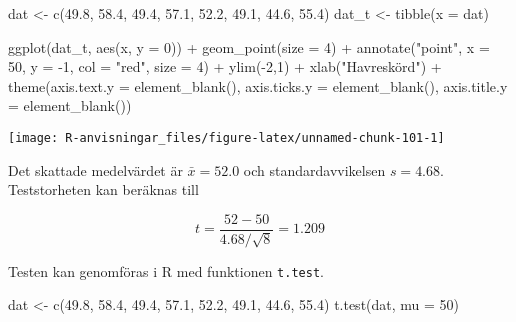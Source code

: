 \documentclass[
]{book}
\newenvironment{Shaded}{\begin{snugshade}}{\end{snugshade}}
\newcommand{\AttributeTok}[1]{\textcolor[rgb]{0.77,0.63,0.00}{#1}}
\newcommand{\DecValTok}[1]{\textcolor[rgb]{0.00,0.00,0.81}{#1}}
\newcommand{\FloatTok}[1]{\textcolor[rgb]{0.00,0.00,0.81}{#1}}
\newcommand{\FunctionTok}[1]{\textcolor[rgb]{0.00,0.00,0.00}{#1}}
\newcommand{\NormalTok}[1]{#1}
\newcommand{\OtherTok}[1]{\textcolor[rgb]{0.56,0.35,0.01}{#1}}
\newcommand{\SpecialCharTok}[1]{\textcolor[rgb]{0.00,0.00,0.00}{#1}}
\newcommand{\StringTok}[1]{\textcolor[rgb]{0.31,0.60,0.02}{#1}}
\theoremstyle{definition}
\theoremstyle{definition}
\theoremstyle{definition}
\theoremstyle{definition}
\theoremstyle{remark}
\begin{document}
\begin{Shaded}
\begin{Highlighting}[]
\NormalTok{dat }\OtherTok{\textless{}{-}} \FunctionTok{c}\NormalTok{(}\FloatTok{49.8}\NormalTok{, }\FloatTok{58.4}\NormalTok{, }\FloatTok{49.4}\NormalTok{, }\FloatTok{57.1}\NormalTok{, }\FloatTok{52.2}\NormalTok{, }\FloatTok{49.1}\NormalTok{, }\FloatTok{44.6}\NormalTok{, }\FloatTok{55.4}\NormalTok{)}
\NormalTok{dat\_t }\OtherTok{\textless{}{-}} \FunctionTok{tibble}\NormalTok{(}\AttributeTok{x =}\NormalTok{ dat)}

\FunctionTok{ggplot}\NormalTok{(dat\_t, }\FunctionTok{aes}\NormalTok{(x, }\AttributeTok{y =} \DecValTok{0}\NormalTok{)) }\SpecialCharTok{+}
  \FunctionTok{geom\_point}\NormalTok{(}\AttributeTok{size =} \DecValTok{4}\NormalTok{) }\SpecialCharTok{+}
  \FunctionTok{annotate}\NormalTok{(}\StringTok{"point"}\NormalTok{, }\AttributeTok{x =} \DecValTok{50}\NormalTok{, }\AttributeTok{y =} \SpecialCharTok{{-}}\DecValTok{1}\NormalTok{, }\AttributeTok{col =} \StringTok{"red"}\NormalTok{, }\AttributeTok{size =} \DecValTok{4}\NormalTok{) }\SpecialCharTok{+}
  \FunctionTok{ylim}\NormalTok{(}\SpecialCharTok{{-}}\DecValTok{2}\NormalTok{,}\DecValTok{1}\NormalTok{) }\SpecialCharTok{+} \FunctionTok{xlab}\NormalTok{(}\StringTok{"Havreskörd"}\NormalTok{) }\SpecialCharTok{+}
  \FunctionTok{theme}\NormalTok{(}\AttributeTok{axis.text.y =} \FunctionTok{element\_blank}\NormalTok{(),}
        \AttributeTok{axis.ticks.y =} \FunctionTok{element\_blank}\NormalTok{(),}
        \AttributeTok{axis.title.y =} \FunctionTok{element\_blank}\NormalTok{())}
\end{Highlighting}
\end{Shaded}

\begin{center}\texttt{[image: R-anvisningar\_files/figure-latex/unnamed-chunk-101-1]} \end{center}

Det skattade medelvärdet är \(\bar x = 52.0\) och standardavvikelsen \(s = 4.68\). Teststorheten kan beräknas till

\[t = \frac{52 - 50}{4.68 / \sqrt 8} = 1.209\]

Testen kan genomföras i R med funktionen \texttt{t.test}.

\begin{Shaded}
\begin{Highlighting}[]
\NormalTok{dat }\OtherTok{\textless{}{-}} \FunctionTok{c}\NormalTok{(}\FloatTok{49.8}\NormalTok{, }\FloatTok{58.4}\NormalTok{, }\FloatTok{49.4}\NormalTok{, }\FloatTok{57.1}\NormalTok{, }\FloatTok{52.2}\NormalTok{, }\FloatTok{49.1}\NormalTok{, }\FloatTok{44.6}\NormalTok{, }\FloatTok{55.4}\NormalTok{)}
\FunctionTok{t.test}\NormalTok{(dat, }\AttributeTok{mu =} \DecValTok{50}\NormalTok{)}
\end{Highlighting}
\end{Shaded}
\end{document}
